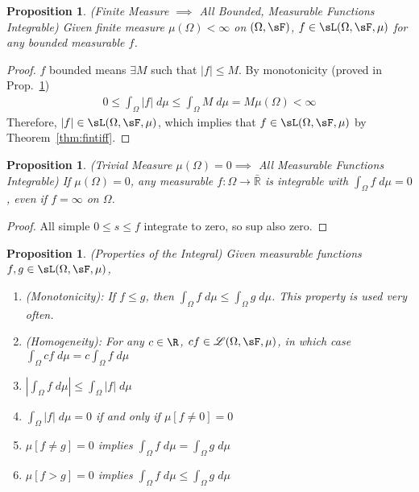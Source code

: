\documentclass[12pt]{article}
\theoremstyle{plain}
\newtheorem{prop}[thm]{Proposition}
\theoremstyle{definition}
\theoremstyle{remark}
\begin{document}
\begin{prop}
\emph{(Finite Measure $\implies$ All Bounded, Measurable Functions
Integrable)}
Given finite measure $\mu(\Omega)<\infty$ on
$(\Omega,\sF)$, $f\in \sL(\Omega,\sF,\mu)$ for any \emph{bounded}
measurable $f$.
\end{prop}
\begin{proof}
$f$ bounded means $\exists M$ such that $|f|\leq M$.
By monotonicity (proved in Prop.~\ref{prop:intprop})
\begin{align*}
  0 \leq \int_\Omega |f|\;d\mu \leq \int_\Omega M \; d\mu
  = M\mu(\Omega)<\infty
\end{align*}
Therefore, $|f|\in\sL(\Omega,\sF,\mu)$, which implies that
$f\in\sL(\Omega,\sF,\mu)$ by Theorem~\ref{thm:fintiff}.
\end{proof}

\begin{prop}
\emph{(Trivial Measure $\mu(\Omega)=0\implies$ All Measurable Functions
Integrable)}
If $\mu(\Omega)=0$, \emph{any} measurable
$f: \Omega\rightarrow\bar{\mathbb{R}}$ is integrable with
$\int_\Omega f \; d\mu=0$, even if $f=\infty$ on $\Omega$.
\end{prop}
\begin{proof}
All simple $0\leq s\leq f$ integrate to zero, so sup also zero.
\end{proof}

\clearpage
\begin{prop}\emph{(Properties of the Integral)}
\label{prop:intprop}
Given measurable functions $f,g\in\sL(\Omega,\sF,\mu)$,
\begin{enumerate}[label=\emph{(\roman*)}]
  \item \emph{(Monotonicity)}:
    If $f\leq g$, then $\int_\Omega f \; d\mu \leq \int_\Omega g \;d\mu$.
    This property is used very often.
  \item \emph{(Homogeneity)}:
    For any $c\in\R$, $cf\in\mathscr{L}(\Omega,\sF,\mu)$, in which case
    $\int_\Omega cf\;d\mu = c\int_\Omega f\;d\mu$
  \item
    $\left\lvert \int_\Omega f \; d\mu\right\rvert \leq
    \int_\Omega \left\lvert f \right\rvert \; d\mu$
  \item
    $\int_\Omega |f| \; d\mu = 0$ if and only if $\mu[f\neq 0] = 0$
  \item $\mu[f\neq g] = 0$ implies
    $\int_\Omega f \; d\mu = \int_\Omega g \; d\mu$
  \item $\mu[f > g] = 0$ implies
    $\int_\Omega f \; d\mu \leq \int_\Omega g \; d\mu$
\end{enumerate}
\end{prop}
\end{document}
